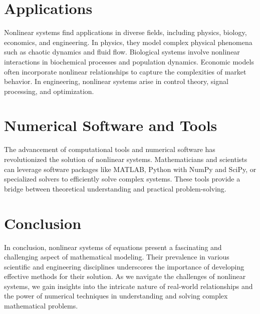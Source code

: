 \documentclass{article}
\begin{document}
\section*{Applications}
Nonlinear systems find applications in diverse fields, including physics, biology, economics, and engineering. In physics, they model complex physical phenomena such as chaotic dynamics and fluid flow. Biological systems involve nonlinear interactions in biochemical processes and population dynamics. Economic models often incorporate nonlinear relationships to capture the complexities of market behavior. In engineering, nonlinear systems arise in control theory, signal processing, and optimization.

\section*{Numerical Software and Tools}
The advancement of computational tools and numerical software has revolutionized the solution of nonlinear systems. Mathematicians and scientists can leverage software packages like MATLAB, Python with NumPy and SciPy, or specialized solvers to efficiently solve complex systems. These tools provide a bridge between theoretical understanding and practical problem-solving.

\section*{Conclusion}
In conclusion, nonlinear systems of equations present a fascinating and challenging aspect of mathematical modeling. Their prevalence in various scientific and engineering disciplines underscores the importance of developing effective methods for their solution. As we navigate the challenges of nonlinear systems, we gain insights into the intricate nature of real-world relationships and the power of numerical techniques in understanding and solving complex mathematical problems.
\end{document}
